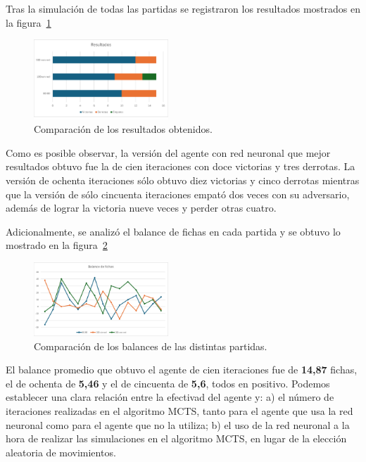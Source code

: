 \documentclass[conference]{IEEEtran}
\begin{document}
Tras la simulación de todas las partidas se registraron los resultados mostrados en la figura~\ref{fig:resultados}

\begin{figure}[htbp]
    \centering
    \includegraphics[width=0.45\textwidth]{grafico_resultados.png}
    \caption{Comparación de los resultados obtenidos.}
    \label{fig:resultados}
\end{figure}

Como es posible observar, la versión del agente con red neuronal que mejor resultados obtuvo fue la de cien iteraciones con doce victorias y tres derrotas. La versión de ochenta iteraciones sólo obtuvo diez victorias y cinco derrotas mientras que la versión de sólo cincuenta iteraciones empató dos veces con su adversario, además de lograr la victoria nueve veces y perder otras cuatro.

Adicionalmente, se analizó el balance de fichas en cada partida y se obtuvo lo mostrado en la figura~\ref{fig:balances}

\begin{figure}[htbp]
    \centering
    \includegraphics[width=0.45\textwidth]{grafico_balances.png}
    \caption{Comparación de los balances de las distintas partidas.}
    \label{fig:balances}
\end{figure}

El balance promedio que obtuvo el agente de cien iteraciones fue de \textbf{14,87} fichas, el de ochenta de \textbf{5,46} y el de cincuenta de \textbf{5,6}, todos en positivo. Podemos establecer una clara relación entre la efectivad del agente y: a) el número de iteraciones realizadas en el algoritmo MCTS, tanto para el agente que usa la red neuronal como para el agente que no la utiliza; b) el uso de la red neuronal a la hora de realizar las simulaciones en el algoritmo MCTS, en lugar de la elección aleatoria de movimientos.
\end{document}
